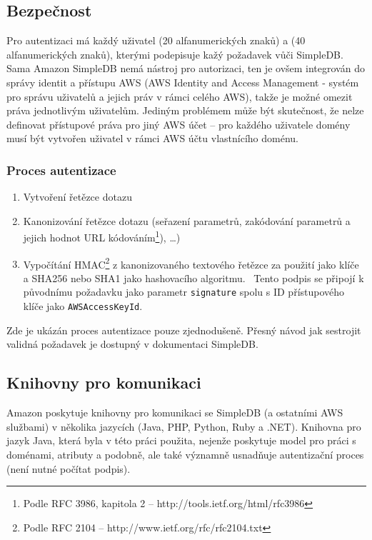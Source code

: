 \documentclass[oneside,11pt]{fithesis2}
\begin{document}
\subsection*{Bezpečnost}
Pro autentizaci má každý uživatel  (20 alfanumerických znaků) a  (40 alfanumerických znaků), kterými podepisuje kažý požadavek vůči SimpleDB. Sama Amazon SimpleDB nemá nástroj pro autorizaci, ten je ovšem integrován do správy identit a přístupu AWS (AWS Identity and Access Management - systém pro správu uživatelů a jejich práv v rámci celého AWS), takže je možné omezit práva jednotlivým uživatelům. Jediným problémem může být skutečnost, že nelze definovat přístupové práva pro jiný AWS účet -- pro každého uživatele domény musí být vytvořen uživatel v rámci AWS účtu vlastnícího doménu.

\subsubsection*{Proces autentizace}
\begin{enumerate}
 \item Vytvoření řetězce dotazu
 \item Kanonizování řetězce dotazu (seřazení parametrů, zakódování parametrů a jejich hodnot URL kódováním\footnote{Podle RFC 3986, kapitola 2 -- http://tools.ietf.org/html/rfc3986}), \dots)
 \item Vypočítání HMAC\footnote{Podle RFC 2104 -- http://www.ietf.org/rfc/rfc2104.txt} z kanonizovaného textového řetězce za použití  jako klíče a SHA256 nebo SHA1 jako hashovacího algoritmu.
 \ Tento podpis se připojí k původnímu požadavku jako parametr \verb<signature< spolu s ID přístupového klíče jako \verb<AWSAccessKeyId<.
\end{enumerate}
Zde je ukázán proces autentizace pouze zjednodušeně. Přesný návod jak sestrojit validná požadavek je dostupný v dokumentaci SimpleDB.

\subsection*{Knihovny pro komunikaci}
Amazon poskytuje knihovny pro komunikaci se SimpleDB (a ostatními AWS službami) v několika jazycích (Java, PHP, Python, Ruby a .NET). 
Knihovna pro jazyk Java, která byla v této práci použita, nejenže poskytuje model pro práci s doménami, atributy a podobně, ale také významně usnadňuje autentizační proces (není nutné  počítat podpis).
\end{document}
